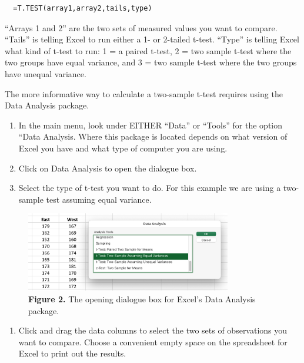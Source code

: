 \documentclass[
]{book}
\providecommand{\tightlist}{%
  \setlength{\itemsep}{0pt}\setlength{\parskip}{0pt}}
\begin{document}
\begin{verbatim}
  =T.TEST(array1,array2,tails,type)
\end{verbatim}

``Arrays 1 and 2'' are the two sets of measured values you want to compare. ``Tails'' is telling Excel to run either a 1- or 2-tailed t-test. ``Type'' is telling Excel what kind of t-test to run: 1 = a paired t-test, 2 = two sample t-test where the two groups have equal variance, and 3 = two sample t-test where the two groups have unequal variance.

The more informative way to calculate a two-sample t-test requires using the Data Analysis package.

\begin{enumerate}
\def\labelenumi{\arabic{enumi}.}
\item
  In the main menu, look under EITHER ``Data'' or ``Tools'' for the option ``Data Analysis. Where this package is located depends on what version of Excel you have and what type of computer you are using.
\item
  Click on Data Analysis to open the dialogue box.
\item
  Select the type of t-test you want to do. For this example we are using a two-sample test assuming equal variance.
\end{enumerate}

\begin{figure}
\centering
\includegraphics[width=0.8\textwidth,height=\textheight]{images/Open_analysis.png}
\caption{\textbf{Figure 2.} The opening dialogue box for Excel's Data Analysis package.}
\end{figure}

\begin{enumerate}
\def\labelenumi{\arabic{enumi}.}
\setcounter{enumi}{3}
\tightlist
\item
  Click and drag the data columns to select the two sets of observations you want to compare. Choose a convenient empty space on the spreadsheet for Excel to print out the results.
\end{enumerate}
\end{document}
